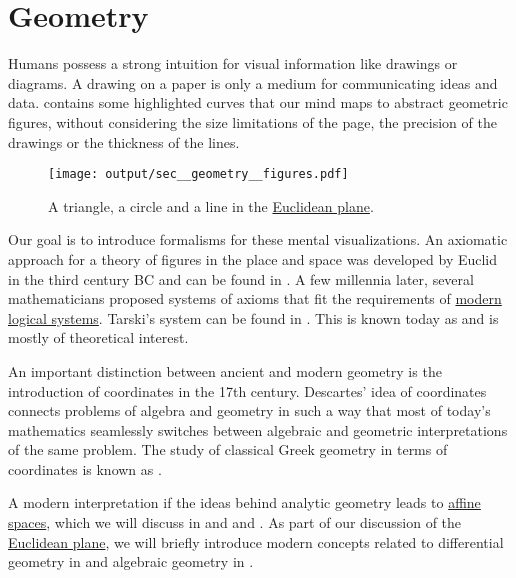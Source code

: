\section{Geometry}\label{sec:geometry}

Humans possess a strong intuition for visual information like drawings or diagrams. A drawing on a paper is only a medium for communicating ideas and data.  contains some highlighted curves that our mind maps to abstract geometric figures, without considering the size limitations of the page, the precision of the drawings or the thickness of the lines.

\begin{figure}[!ht]
  \centering
  \texttt{[image: output/sec\_\_geometry\_\_figures.pdf]}
  \caption{A triangle, a circle and a line in the \hyperref[def:euclidean_space]{Euclidean plane}.}\label{fig:sec:geometry/figures}
\end{figure}

Our goal is to introduce formalisms for these mental visualizations. An axiomatic approach for a theory of figures in the place and space was developed by Euclid in the third century BC and can be found in \cite{Fitzpatrick2008}. A few millennia later, several mathematicians proposed systems of axioms that fit the requirements of \hyperref[sec:mathematical_logic]{modern logical systems}. Tarski's system can be found in \cite{Tarski1959}. This is known today as  and is mostly of theoretical interest.

An important distinction between ancient and modern geometry is the introduction of coordinates in the 17th century. Descartes' idea of coordinates connects problems of algebra and geometry in such a way that most of today's mathematics seamlessly switches between algebraic and geometric interpretations of the same problem. The study of classical Greek geometry in terms of coordinates is known as .

A modern interpretation if the ideas behind analytic geometry leads to \hyperref[def:affine_spaces]{affine spaces}, which we will discuss in  and  and . As part of our discussion of the \hyperref[def:euclidean_space]{Euclidean plane}, we will briefly introduce modern concepts related to differential geometry in  and algebraic geometry in .

